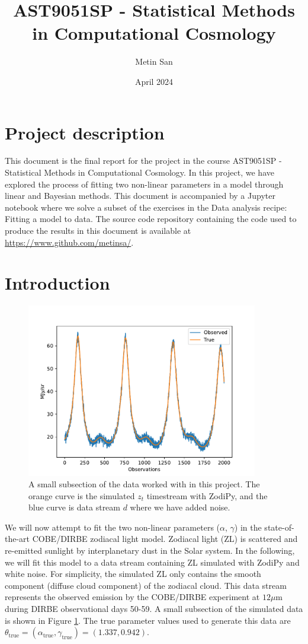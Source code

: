 \documentclass{article}
\title{AST9051SP - Statistical Methods in Computational Cosmology}
\author{Metin San}
\date{April 2024}
\begin{document}
\maketitle

\section*{Project description}
This document is the final report for the project in the course AST9051SP - Statistical Methods in Computational Cosmology.
In this project, we have explored the process of fitting two non-linear parameters in a model through linear and Bayesian methods.
This document is accompanied by a Jupyter notebook where we solve a subset of the exercises in the Data analysis recipe: Fitting a model to data\cite{hogg}. The source code repository containing the code used to produce the results in this document is available at \url{https://www.github.com/metinsa/}.


\section*{Introduction}
\begin{figure}[ht]
    \centering
    \includegraphics[width=0.9\textwidth]{figs/timestream.pdf}
    \caption{A small subsection of the data worked with in this project. The orange curve is the simulated $z_t$ timestream with ZodiPy, and the blue curve is data stream $d$ where we have added noise.}
    \label{fig:data}
\end{figure}
We will now attempt to fit the two non-linear parameters ($\alpha$, $\gamma$) in the state-of-the-art COBE/DIRBE zodiacal light model\cite{Kelsall1998}. Zodiacal light (ZL) is scattered and re-emitted sunlight by interplanetary dust in the Solar system. In the following, we will fit this model to a data stream containing ZL simulated with ZodiPy\cite{zodipy} and white noise. For simplicity, the simulated ZL only contains the smooth component (diffuse cloud component) of the zodiacal cloud. This data stream represents the observed emission by the COBE/DIRBE experiment at $12 \mu$m during DIRBE observational days 50-59. A small subsection of the simulated data is shown in Figure \ref{fig:data}. The true parameter values used to generate this data are $\theta_\mathrm{true} = (\alpha_\mathrm{true}, \gamma_\mathrm{true}) = (1.337, 0.942)$.
\end{document}
